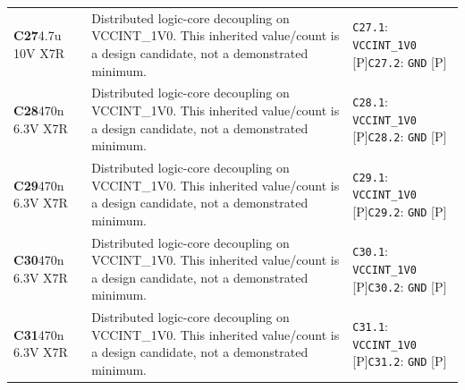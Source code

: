 \documentclass[11pt,a4paper]{article}
\begin{document}
\begin{longtable}{@{}P{27mm}P{83mm}P{58mm}@{}}
\textbf{C27}\newline 4.7u 10V X7R & Distributed logic-core decoupling on VCCINT\_1V0. This inherited value/count is a design candidate, not a demonstrated minimum. & \nolinkurl{C27.1}: \nolinkurl{VCCINT_1V0} [P]\newline \nolinkurl{C27.2}: \nolinkurl{GND} [P] \\
\textbf{C28}\newline 470n 6.3V X7R & Distributed logic-core decoupling on VCCINT\_1V0. This inherited value/count is a design candidate, not a demonstrated minimum. & \nolinkurl{C28.1}: \nolinkurl{VCCINT_1V0} [P]\newline \nolinkurl{C28.2}: \nolinkurl{GND} [P] \\
\textbf{C29}\newline 470n 6.3V X7R & Distributed logic-core decoupling on VCCINT\_1V0. This inherited value/count is a design candidate, not a demonstrated minimum. & \nolinkurl{C29.1}: \nolinkurl{VCCINT_1V0} [P]\newline \nolinkurl{C29.2}: \nolinkurl{GND} [P] \\
\textbf{C30}\newline 470n 6.3V X7R & Distributed logic-core decoupling on VCCINT\_1V0. This inherited value/count is a design candidate, not a demonstrated minimum. & \nolinkurl{C30.1}: \nolinkurl{VCCINT_1V0} [P]\newline \nolinkurl{C30.2}: \nolinkurl{GND} [P] \\
\textbf{C31}\newline 470n 6.3V X7R & Distributed logic-core decoupling on VCCINT\_1V0. This inherited value/count is a design candidate, not a demonstrated minimum. & \nolinkurl{C31.1}: \nolinkurl{VCCINT_1V0} [P]\newline \nolinkurl{C31.2}: \nolinkurl{GND} [P] \\

\end{longtable}
\end{document}
